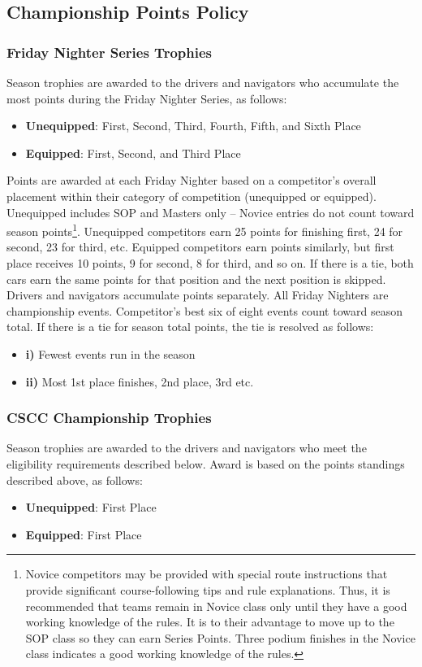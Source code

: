 \subsection{Championship Points Policy}
\subsubsection{Friday Nighter Series Trophies}
Season trophies are awarded to the drivers and navigators who accumulate the most points during the Friday Nighter Series, as follows:
\begin{itemize}
\item \textbf{Unequipped}: First, Second, Third, Fourth, Fifth, and Sixth Place
\item \textbf{Equipped}: First, Second, and Third Place
\end{itemize}

Points are awarded at each Friday Nighter based on a competitor’s overall placement within their category of competition (unequipped or equipped).
Unequipped includes SOP and Masters only – Novice entries do not count toward season points\footnote{
Novice competitors may be provided with special route instructions that provide significant course-following tips and rule explanations. Thus, it is recommended that teams remain in Novice class only until they have a good working knowledge of the rules. It is to their advantage to move up to the SOP class so they can earn Series Points. Three podium finishes in the Novice class indicates a good working knowledge of the rules.
}.
Unequipped competitors earn 25 points for finishing first, 24 for second, 23 for third, etc. Equipped competitors earn points similarly, but first place receives 10 points, 9 for second, 8 for third, and so on.
If there is a tie, both cars earn the same points for that position and the next position is skipped.
Drivers and navigators accumulate points separately.
All Friday Nighters are championship events.
Competitor’s best six of eight events count toward season total.
If there is a tie for season total points, the tie is resolved as follows:
\begin{itemize}
\item \textbf{i)} Fewest events run in the season
\item \textbf{ii)} Most 1st place finishes, 2nd place, 3rd etc.
\end{itemize}

\subsubsection{CSCC Championship Trophies}
Season trophies are awarded to the drivers and navigators who meet the eligibility requirements described below. Award is based on the points standings described above, as follows:
\begin{itemize}
\item \textbf{Unequipped}: First Place
\item \textbf{Equipped}: First Place
\end{itemize}

